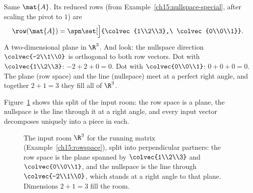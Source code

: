 \begin{example}\label{ch15:rowspace}
Same $\mat{A}$. Its reduced rows (from Example~\ref{ch15:nullspace-special}, after scaling the
pivot to $1$) are
\[
  \row(\mat{A}) = \spn\set[\Big]{\colvec{1\\2\\3},\ \colvec{0\\0\\1}}.
\]
A two-dimensional plane in $\R^3$. And look: the nullspace direction $\colvec{-2\\1\\0}$ is
orthogonal to both row vectors. Dot with $\colvec{1\\2\\3}$: $-2+2+0=0$. Dot with
$\colvec{0\\0\\1}$: $0+0+0=0$. The plane (row space) and the line (nullspace) meet at a perfect
right angle, and together $2+1=3$ they fill all of $\R^3$.
\end{example}

Figure~\ref{ch15:rowspace-null} shows this split of the input room: the row space is a plane, the
nullspace is the line through it at a right angle, and every input vector decomposes uniquely into a
piece in each.

\begin{figure}[H]
\centering
{}
\caption{The input room $\R^3$ for the running matrix
(Example~\ref{ch15:rowspace}), split into perpendicular partners: the row space is the plane
spanned by $\protect\colvec{1\\2\\3}$ and $\protect\colvec{0\\0\\1}$, and the nullspace is the line
through $\protect\colvec{-2\\1\\0}$, which stands at a right angle to that plane. Dimensions
$2+1=3$ fill the room.}
\label{ch15:rowspace-null}
\end{figure}

